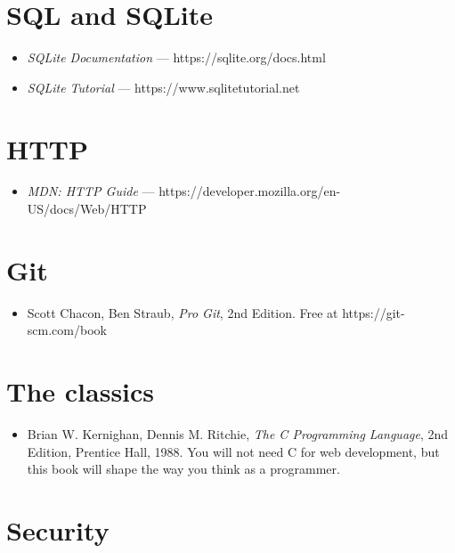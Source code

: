 \documentclass[11pt,a4paper,oneside]{book}
\providecommand{\tightlist}{%
  \setlength{\itemsep}{0pt}\setlength{\parskip}{0pt}}
\begin{document}
\hypertarget{sql-and-sqlite}{%
\section{SQL and SQLite}\label{sql-and-sqlite}}

\begin{itemize}
\tightlist
\item
  \emph{SQLite Documentation} --- https://sqlite.org/docs.html
\item
  \emph{SQLite Tutorial} --- https://www.sqlitetutorial.net
\end{itemize}

\hypertarget{http}{%
\section{HTTP}\label{http}}

\begin{itemize}
\tightlist
\item
  \emph{MDN: HTTP Guide} ---
  https://developer.mozilla.org/en-US/docs/Web/HTTP
\end{itemize}

\hypertarget{git}{%
\section{Git}\label{git}}

\begin{itemize}
\tightlist
\item
  Scott Chacon, Ben Straub, \emph{Pro Git}, 2nd Edition. Free at
  https://git-scm.com/book
\end{itemize}

\hypertarget{the-classics}{%
\section{The classics}\label{the-classics}}

\begin{itemize}
\tightlist
\item
  Brian W. Kernighan, Dennis M. Ritchie, \emph{The C Programming
  Language}, 2nd Edition, Prentice Hall, 1988. You will not need
  C for web development, but this book will shape the way you
  think as a programmer.
\end{itemize}

\hypertarget{security-1}{%
\section{Security}\label{security-1}}
\end{document}
